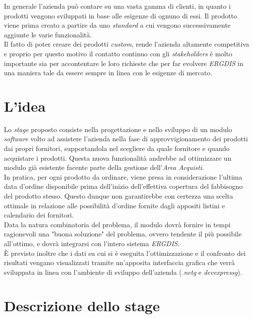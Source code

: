 \noindent In generale l'azienda può contare su una vasta gamma di clienti,
in quanto i prodotti vengono sviluppati in base alle esigenze di ognuno di essi.
Il prodotto viene prima creato a partire da uno \textit{standard}
a cui vengono successivamente aggiunte le varie funzionalità.\\
Il fatto di poter creare dei prodotti \textit{custom}, rende l'azienda altamente competitiva
e proprio per questo motivo il contatto
continuo con gli \textit{stakeholders} è molto importante sia per accontentare le loro richieste che per
far evolvere \textit{ERGDIS} in una maniera tale da essere sempre in linea con le esigenze di mercato.


\section{L'idea}
\noindent Lo \textit{stage} proposto consiste nella progettazione e nello sviluppo di un modulo \textit{software} volto
ad assistere l'azienda nella fase di approvvigionamento dei prodotti dai propri fornitori, supportandola nel scegliere
da quale fornitore e quando acquistare i prodotti.
\noindent Questa nuova funzionalità andrebbe ad ottimizzare un modulo già esistente facente parte della
gestione dell'\textit{Area Acquisti}.\\
In pratica, per ogni prodotto da ordinare, viene presa in considerazione l'ultima data d'ordine disponibile prima dell'inizio
dell'effettiva copertura del fabbisogno del prodotto stesso. Questo dunque non garantirebbe con certezza una scelta ottimale
in relazione alle possibilità d'ordine fornite dagli appositi listini e calendario dei fornitori.\\

\noindent Data la natura combinatoria del problema, il modulo dovrà fornire in tempi ragionevoli una "buona soluzione"
del problema, ovvero tendente il più possibile all'ottimo, e dovrà integrarsi con l'intero sistema \textit{ERGDIS}.\\

\noindent È previsto inoltre che i dati su cui si è eseguita l'ottimizzazione e il confronto dei risultati vengano visualizzati tramite un'apposita
interfaccia grafica che verrà sviluppata in linea con l'ambiente di sviluppo dell'azienda (\textit{\gls{.netg}} e \textit{\gls{devexpressg}}).


\section{Descrizione dello stage}

